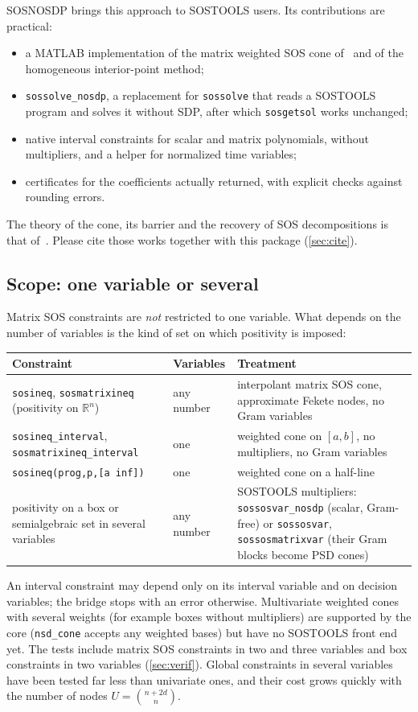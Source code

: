 \documentclass[11pt,a4paper]{article}
\newcommand{\R}{\mathbb{R}}
\newcommand{\code}[1]{\texttt{#1}}
\begin{document}
SOSNOSDP brings this approach to SOSTOOLS users. Its contributions are practical:
\begin{itemize}[itemsep=1pt]
\item a MATLAB implementation of the matrix weighted SOS cone of~\cite{KCV2023} and of the homogeneous interior-point method;
\item \code{sossolve\_nosdp}, a replacement for \code{sossolve} that reads a SOSTOOLS program and solves it without SDP, after which \code{sosgetsol} works unchanged;
\item native interval constraints for scalar and matrix polynomials, without multipliers, and a helper for normalized time variables;
\item certificates for the coefficients actually returned, with explicit checks against rounding errors.
\end{itemize}
The theory of the cone, its barrier and the recovery of SOS decompositions is that of~\cite{PappYildiz2019,KCV2023}. Please cite those works together with this package (\cref{sec:cite}).

\subsection{Scope: one variable or several}\label{sec:scope}
Matrix SOS constraints are \emph{not} restricted to one variable. What depends on the number of variables is the kind of set on which positivity is imposed:
\begin{center}\small
\begin{tabular}{p{4.8cm}p{1.9cm}p{6.6cm}}
\toprule
Constraint & Variables & Treatment\\
\midrule
\code{sosineq}, \code{sosmatrixineq} (positivity on $\R^n$) & any number & interpolant matrix SOS cone, approximate Fekete nodes, no Gram variables\\
\code{sosineq\_interval}, \code{sosmatrixineq\_interval} & one & weighted cone on $[a,b]$, no multipliers, no Gram variables\\
\code{sosineq(prog,p,[a inf])} & one & weighted cone on a half-line\\
positivity on a box or semialgebraic set in several variables & any number & SOSTOOLS multipliers: \code{sossosvar\_nosdp} (scalar, Gram-free) or \code{sossosvar}, \code{sossosmatrixvar} (their Gram blocks become PSD cones)\\
\bottomrule
\end{tabular}
\end{center}
An interval constraint may depend only on its interval variable and on decision variables; the bridge stops with an error otherwise. Multivariate weighted cones with several weights (for example boxes without multipliers) are supported by the core (\code{nsd\_cone} accepts any weighted bases) but have no SOSTOOLS front end yet. The tests include matrix SOS constraints in two and three variables and box constraints in two variables (\cref{sec:verif}). Global constraints in several variables have been tested far less than univariate ones, and their cost grows quickly with the number of nodes $U=\binom{n+2d}{n}$.
\end{document}
